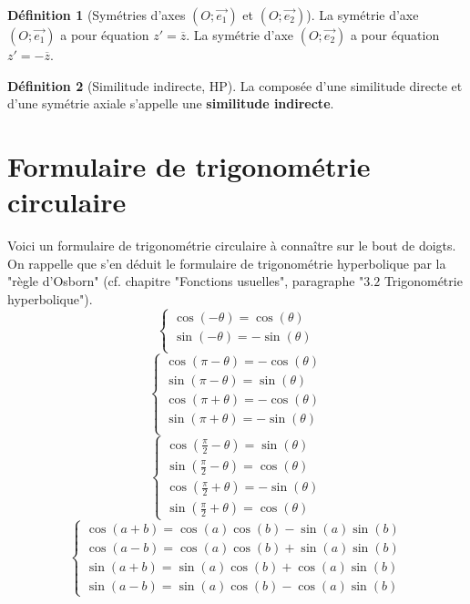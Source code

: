 \documentclass[french]{book}
\theoremstyle{plain}
\theoremstyle{definition}
\newtheorem{dfn}{Définition}[chapter]
\theoremstyle{remark}
\begin{document}
\begin{dfn}[Symétries d'axes $(O;\overrightarrow{e_1})$ et $(O;\overrightarrow{e_2})$]
	La symétrie d'axe $(O;\overrightarrow{e_1})$ a pour équation $z'=\overline{z}$. La symétrie d'axe $(O;\overrightarrow{e_2})$ a pour équation $z'=-\overline{z}$.
\end{dfn}
\begin{dfn}[Similitude indirecte, HP]
	La composée d'une similitude directe et d'une symétrie axiale s'appelle une \textbf{similitude indirecte}.
\end{dfn}
\section{Formulaire de trigonométrie circulaire}
Voici un formulaire de trigonométrie circulaire à connaître sur le bout de doigts. On rappelle que s'en déduit le formulaire de trigonométrie hyperbolique par la "règle d'Osborn" (cf. chapitre "Fonctions usuelles", paragraphe "$3.2$ Trigonométrie hyperbolique").
$$\begin{cases}
	\cos(-\theta)=\cos(\theta)\\
	\sin(-\theta)=-\sin(\theta)\\
\end{cases}$$
$$\begin{cases}
	\cos(\pi-\theta)=-\cos(\theta)\\
	\sin(\pi-\theta)=\sin(\theta)\\
	\cos(\pi+\theta)=-\cos(\theta)\\
	\sin(\pi+\theta)=-\sin(\theta)\\
\end{cases}$$
$$\begin{cases}
	\displaystyle\cos\left(\frac{\pi}{2}-\theta\right)=\sin(\theta)\\[3mm]
	\displaystyle\sin\left(\frac{\pi}{2}-\theta\right)=\cos(\theta)\\[3mm]
	\displaystyle\cos\left(\frac{\pi}{2}+\theta\right)=-\sin(\theta)\\[3mm]
	\displaystyle\sin\left(\frac{\pi}{2}+\theta\right)=\cos(\theta)
\end{cases}$$
$$\begin{cases}
	\cos(a+b)=\cos(a)\cos(b)-\sin(a)\sin(b)\\
	\cos(a-b)=\cos(a)\cos(b)+\sin(a)\sin(b)\\
	\sin(a+b)=\sin(a)\cos(b)+\cos(a)\sin(b)\\
	\sin(a-b)=\sin(a)\cos(b)-\cos(a)\sin(b)
\end{cases}$$
\end{document}
